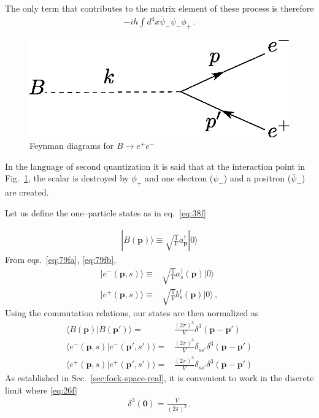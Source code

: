 The only term that contributes to the matrix element of these process is therefore
\begin{align}
  \label{eq:97f}
  -i h \int d^4x\overline{\psi}_-\psi_-\phi_+\,.
\end{align}

\begin{figure} %
  \centering %
  \includegraphics[scale=0.6]{Btoee} %
  \caption{Feynman diagrams for $B\to e^+ e^-$} %
  \label{fig:btoee} %
\end{figure} %
In the language of second quantization it is said that at the interaction point in Fig.~\ref{fig:btoee}, the scalar is destroyed by $\phi_+$ and one electron ($\psi_-$) and a positron ($\bar{\psi}_{-}$) are created.

Let us define the one--particle states as in eq.~\eqref{eq:38f}

\begin{align}
  | B(\mathbf{p})\rangle\equiv\sqrt{\frac{1}{V}}a^\dagger_{\mathbf{p}}|0\rangle 
\end{align}
From eqs.~\eqref{eq:79fa}, \eqref{eq:79fb}, 
\begin{align}
  \label{eq:77f}
   | e^-(\mathbf{p},s)\rangle\equiv&\sqrt{\frac{1}{V}}a^\dagger_s(\mathbf{p})|0\rangle\nonumber\\
   | e^+(\mathbf{p},s)\rangle\equiv&\sqrt{\frac{1}{V}}{b}^\dagger_s(\mathbf{p})|0\rangle\,, 
\end{align}
Using the commutation relations, our states are then normalized as
\begin{align}
\langle B(\mathbf{p})| B(\mathbf{p}')\rangle=&\frac{(2\pi)^3}{V}\delta^3(\mathbf{p}-\mathbf{p}')\nonumber\\
\langle e^-(\mathbf{p},s)| e^-(\mathbf{p}',s')\rangle=&\frac{(2\pi)^3}{V}\delta_{s s'}\delta^3(\mathbf{p}-\mathbf{p}')\nonumber\\
\langle e^+(\mathbf{p},s)| e^+(\mathbf{p}',s')\rangle=&\frac{(2\pi)^3}{V}\delta_{s s'}\delta^3(\mathbf{p}-\mathbf{p}')
\end{align}
As established in Sec.~\ref{sec:fock-space-real}, it is convenient to work in the discrete limit where \eqref{eq:26f}
\begin{align}
   \delta^3(\mathbf{0})=\frac{V}{(2\pi)^3}\,.
\end{align}

